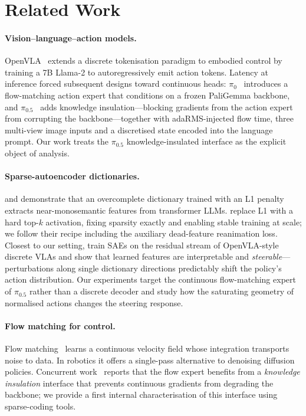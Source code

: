 \section{Related Work}
\label{sec:related}

\paragraph{Vision--language--action models.}
OpenVLA~\citep{kim2024openvla} extends a discrete tokenisation paradigm to
embodied control by training a 7B Llama-2 to autoregressively emit action
tokens. Latency at inference forced subsequent designs toward continuous
heads: $\pi_0$~\citep{black2024pi0} introduces a flow-matching action expert
that conditions on a frozen PaliGemma backbone, and
$\pi_{0.5}$~\citep{black2025pi05} adds knowledge insulation---blocking
gradients from the action expert from corrupting the backbone---together with
adaRMS-injected flow time, three multi-view image inputs and a discretised
state encoded into the language prompt. Our work treats the
$\pi_{0.5}$ knowledge-insulated interface as the explicit object of analysis.

\paragraph{Sparse-autoencoder dictionaries.}
\citet{cunningham2023sparse} and \citet{bricken2023monosemanticity} demonstrate
that an overcomplete dictionary trained with an L1 penalty extracts
near-monosemantic features from transformer LLMs.
\citet{gao2024scaling} replace L1 with a hard top-$k$ activation, fixing
sparsity exactly and enabling stable training at scale; we follow their recipe
including the auxiliary dead-feature reanimation loss. Closest to our setting,
\citet{swann2026sae} train SAEs on the residual stream of OpenVLA-style
discrete VLAs and show that learned features are interpretable and
\emph{steerable}---perturbations along single dictionary directions
predictably shift the policy's action distribution. Our experiments target the
continuous flow-matching expert of $\pi_{0.5}$ rather than a discrete decoder
and study how the saturating geometry of normalised actions changes the
steering response.

\paragraph{Flow matching for control.}
Flow matching~\citep{lipman2023flow} learns a continuous velocity field whose
integration transports noise to data. In robotics it offers a single-pass
alternative to denoising diffusion policies. Concurrent
work~\citep{black2025pi05} reports that the flow expert benefits from a
\emph{knowledge insulation} interface that prevents continuous gradients from
degrading the backbone; we provide a first internal characterisation of this
interface using sparse-coding tools.
